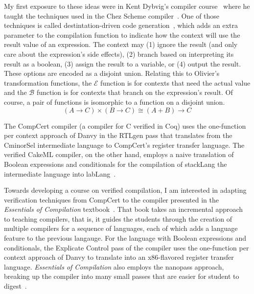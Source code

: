 \documentclass[sigplan,review,dvipsnames,screen,10pt]{acmart}
\begin{document}
My first exposure to these ideas were in Kent Dybvig's compiler
course~\citep{Dybvig:2010aa} where he taught the techniques used in
the Chez Scheme compiler~\citep{Dybvig:2006aa}.  One of those
techniques is called destintation-driven code
generation~\cite{Dybvig:1990aa}, which adds an extra parameter to the
compilation function to indicate how the context will use the result
value of an expression. The context may (1) ignore the result (and
only care about the expression's side effects), (2) branch based on
interpreting its result as a boolean, (3) assign the result to a
variable, or (4) output the result. These options are encoded as a
disjoint union.  Relating this to Olivier's transformation functions,
the $\mathcal{E}$ function is for contexts that need the actual value
and the $\mathcal{B}$ function is for contexts that branch on the
expression's result. Of course, a pair of functions is isomorphic to a
function on a disjoint union.
\[
(A → C) × (B → C) ≅ (A + B) → C
\]

The CompCert compiler \citep{Leroy:2006fe} (a compiler for C verified
in Coq) uses the one-function per context approach of Danvy in the
RTLgen pass that translates from the CminorSel intermediate language
to CompCert's register transfer language. The verified CakeML
compiler, on the other hand, employs a naive translation of Boolean
expressions and conditionals for the compilation of stackLang the
intermediate language into labLang~\citep{Kumar:2014aa}.

Towards developing a course on verified compilation, I am interested
in adapting verification techniques from CompCert to the compiler
presented in the \emph{Essentials of Compilation}
textbook~\citep{Siek:2023tr,Siek:2023ue}. That book takes an
incremental approach to teaching compilers, that is, it guides the
students through the creation of multiple compilers for a sequence of
languages, each of which adds a language feature to the previous
langauge. For the language with Boolean expressions and conditionals,
the Explicate Control pass of the compiler uses the one-function per
context approach of Danvy to translate into an x86-flavored register
transfer language.  \emph{Essentials of Compilation} also employs the
nanopass approach, breaking up the compiler into many small passes
that are easier for student to digest~\citep{Sarkar:2004fk}.
\end{document}
